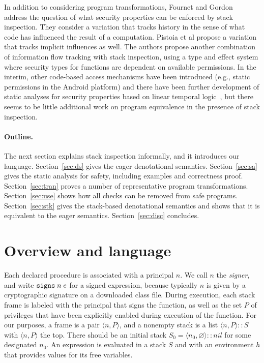 \documentclass[submission,copyright,creativecommons]{eptcs}
\newcommand{\signs}[2]{\SIGNS\;#1\;#2}
\newcommand{\Empty}{\varnothing}
\newcommand{\tuple}[1]{\langle #1 \rangle}
\newcommand{\SIGNS}{\mbox{\texttt{signs}}}
\newcommand{\n}{n} \newcommand{\p}{p} \newcommand{\Ps}{\Pi} \newcommand{\h}{h}
\begin{document}
In addition to considering program transformations, Fournet and Gordon~\cite{FournetG03} 
 address the question of what security properties can be enforced by stack inspection.  They consider a variation that tracks history in the sense of what code has influenced the result of a computation.  Pistoia et al \cite{PistoiaBanerjeeNaumann} propose a variation that tracks implicit influences as well.  The authors \cite{BanerjeeNaumann03b} propose another combination of information flow tracking with stack inspection, using a type and effect system  where security types for functions are dependent on available permissions. 
In the interim, other code-based access mechanisms have been introduced (e.g., static permissions in the Android platform) and there have been further development of static analyses for security properties based on linear temporal logic~\cite{BessonJM01,BessonBFG04,BessonLJ05,skalkaSVh08},
but there seems to be little additional work on program equivalence in the presence of stack inspection. 



\paragraph{Outline.}

The next section explains stack inspection informally, and it introduces our language.
Section~\ref{sec:ds} gives the eager denotational semantics.
Section~\ref{sec:sa} gives the static analysis for safety, including examples and correctness proof.
Section~\ref{sec:tran} proves a number of representative program transformations.
Section~\ref{sec:use} shows how all checks can be removed from safe programs.
Section~\ref{sec:stk} gives the stack-based denotational semantics and shows that it is equivalent to the eager semantics.
Section~\ref{sec:disc} concludes.

\section{Overview and language} 
\label{sec:ov}


Each declared procedure is associated with a principal $\n$.  We call
$\n$ the \emph{signer}, and write $\signs{\n}{e}$ for a signed
expression, because typically $\n$ is given by a cryptographic
signature on a downloaded class file.  During execution, each stack
frame is labeled with the principal that signs the function, as well
as the set $P$ of privileges that have been explicitly enabled during
execution of the function.  For our purposes, a frame is a pair
$\tuple{\n,P}$, and a nonempty stack is a list $\tuple{\n,P}::S$ with
$\tuple{\n,P}$ the top.  There should be an initial stack $S_0 =
\tuple{\n_0,\Empty}::nil$ for some designated $\n_0$.  An expression
is evaluated in a stack $S$ and with an environment $\h$ that provides
values for its free variables.
\end{document}
